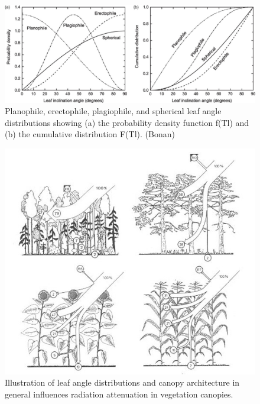 \documentclass[
  oneside]{book}
\begin{document}
\begin{figure}

{\centering \includegraphics[width=0.8\linewidth]{figures/chap3/f34_angle_distr} 

}

\caption{Planophile, erectophile, plagiophile, and spherical leaf angle distributions showing (a) the probability density function f(Tl) and (b) the cumulative distribution F(Tl). (Bonan)}\label{fig:f34}
\end{figure}

\begin{figure}

{\centering \includegraphics[width=0.8\linewidth]{figures/chap3/f35_architecture} 

}

\caption{Illustration of leaf angle distributions and canopy architecture in general influences radiation attenuation in vegetation canopies.}\label{fig:f35}
\end{figure}
\end{document}
